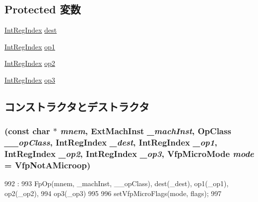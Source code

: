 \subsection*{Protected 変数}
\begin{DoxyCompactItemize}
\item 
\hyperlink{namespaceArmISA_ae64680ba9fb526106829d6bf92fc791b}{IntRegIndex} \hyperlink{classArmISA_1_1FpRegRegRegRegOp_aec72e8e45bdc87abeeeb75d2a8a9a716}{dest}
\item 
\hyperlink{namespaceArmISA_ae64680ba9fb526106829d6bf92fc791b}{IntRegIndex} \hyperlink{classArmISA_1_1FpRegRegRegRegOp_a4c465c43ad568f8bcf8ae71480e9cfea}{op1}
\item 
\hyperlink{namespaceArmISA_ae64680ba9fb526106829d6bf92fc791b}{IntRegIndex} \hyperlink{classArmISA_1_1FpRegRegRegRegOp_a7799ff6cbe5a252199059eb8665820e7}{op2}
\item 
\hyperlink{namespaceArmISA_ae64680ba9fb526106829d6bf92fc791b}{IntRegIndex} \hyperlink{classArmISA_1_1FpRegRegRegRegOp_aeebae963914149e59062881eccc25c48}{op3}
\end{DoxyCompactItemize}


\subsection{コンストラクタとデストラクタ}
\hypertarget{classArmISA_1_1FpRegRegRegRegOp_a8e23df532b84bdaaa2e4bc243a1068fd}{
\subsubsection[{FpRegRegRegRegOp}]{ (const char $\ast$ {\em mnem}, \/  {\bf ExtMachInst} {\em \_\-machInst}, \/  OpClass {\em \_\-\_\-opClass}, \/  {\bf IntRegIndex} {\em \_\-dest}, \/  {\bf IntRegIndex} {\em \_\-op1}, \/  {\bf IntRegIndex} {\em \_\-op2}, \/  {\bf IntRegIndex} {\em \_\-op3}, \/  {\bf VfpMicroMode} {\em mode} = {\ttfamily VfpNotAMicroop})}}
\label{classArmISA_1_1FpRegRegRegRegOp_a8e23df532b84bdaaa2e4bc243a1068fd}



\begin{DoxyCode}
992                                                                            :
993         FpOp(mnem, _machInst, __opClass), dest(_dest), op1(_op1), op2(_op2),
994         op3(_op3)
995     {
996         setVfpMicroFlags(mode, flags);
997     }

\end{DoxyCode}


